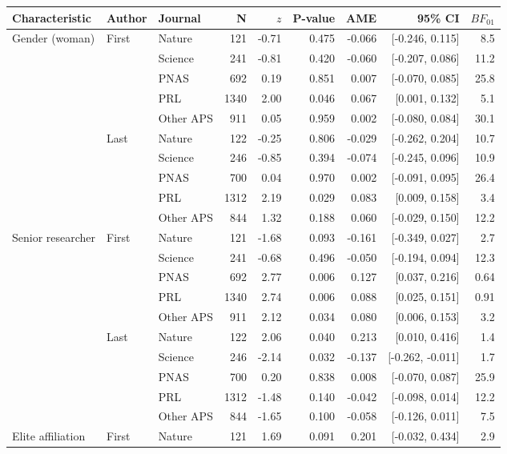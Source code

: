 \begin{tabular}{lllrrrrrr}
\toprule
Characteristic & Author & Journal & N & $z$ & P-value & AME & 95\% CI & $BF_{01}$ \\
\midrule
Gender (woman) & First & Nature & 121 & -0.71 & 0.475 & -0.066 & [-0.246, 0.115] & 8.5 \\
 &  & Science & 241 & -0.81 & 0.420 & -0.060 & [-0.207, 0.086] & 11.2 \\
 &  & PNAS & 692 & 0.19 & 0.851 & 0.007 & [-0.070, 0.085] & 25.8 \\
 &  & PRL & 1340 & 2.00 & 0.046 & 0.067 & [0.001, 0.132] & 5.1 \\
 &  & Other APS & 911 & 0.05 & 0.959 & 0.002 & [-0.080, 0.084] & 30.1 \\
 & Last & Nature & 122 & -0.25 & 0.806 & -0.029 & [-0.262, 0.204] & 10.7 \\
 &  & Science & 246 & -0.85 & 0.394 & -0.074 & [-0.245, 0.096] & 10.9 \\
 &  & PNAS & 700 & 0.04 & 0.970 & 0.002 & [-0.091, 0.095] & 26.4 \\
 &  & PRL & 1312 & 2.19 & 0.029 & 0.083 & [0.009, 0.158] & 3.4 \\
 &  & Other APS & 844 & 1.32 & 0.188 & 0.060 & [-0.029, 0.150] & 12.2 \\
\midrule
Senior researcher & First & Nature & 121 & -1.68 & 0.093 & -0.161 & [-0.349, 0.027] & 2.7 \\
 &  & Science & 241 & -0.68 & 0.496 & -0.050 & [-0.194, 0.094] & 12.3 \\
 &  & PNAS & 692 & 2.77 & 0.006 & 0.127 & [0.037, 0.216] & 0.64 \\
 &  & PRL & 1340 & 2.74 & 0.006 & 0.088 & [0.025, 0.151] & 0.91 \\
 &  & Other APS & 911 & 2.12 & 0.034 & 0.080 & [0.006, 0.153] & 3.2 \\
 & Last & Nature & 122 & 2.06 & 0.040 & 0.213 & [0.010, 0.416] & 1.4 \\
 &  & Science & 246 & -2.14 & 0.032 & -0.137 & [-0.262, -0.011] & 1.7 \\
 &  & PNAS & 700 & 0.20 & 0.838 & 0.008 & [-0.070, 0.087] & 25.9 \\
 &  & PRL & 1312 & -1.48 & 0.140 & -0.042 & [-0.098, 0.014] & 12.2 \\
 &  & Other APS & 844 & -1.65 & 0.100 & -0.058 & [-0.126, 0.011] & 7.5 \\
\midrule
Elite affiliation & First & Nature & 121 & 1.69 & 0.091 & 0.201 & [-0.032, 0.434] & 2.9 \\

\end{tabular}
